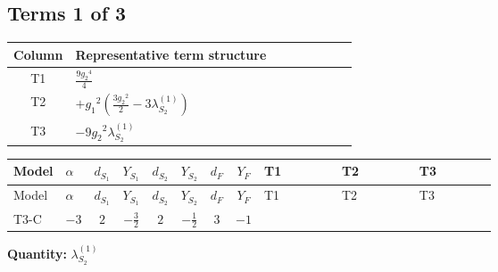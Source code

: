 \documentclass[8pt]{article}
\begin{document}
\begin{landscape}
\subsection*{Terms 1 of 3}
\begin{center}
\begin{tabular}{@{}c >{\raggedright\arraybackslash}p{0.82\linewidth}@{}}
\toprule
Column & Representative term structure \\
\midrule
T1 & \(\displaystyle \frac{9 {g_2}^4}{4}\) \\
\midrule
T2 & \(\displaystyle +{g_1}^2 \left(\frac{3 {g_2}^2}{2}-3 {\lambda_{S_2}^{(1)}}\right)\) \\
\midrule
T3 & \(\displaystyle -9 {g_2}^2 {\lambda_{S_2}^{(1)}}\) \\
\midrule
\bottomrule
\end{tabular}
\end{center}
\smallskip
\tiny
\begin{longtable}{@{}llcccccc >{\raggedright\arraybackslash}p{0.21\linewidth} >{\raggedright\arraybackslash}p{0.21\linewidth} >{\raggedright\arraybackslash}p{0.21\linewidth}@{}}
\toprule
Model & $\alpha$ & $d_{S_1}$ & $Y_{S_1}$ & $d_{S_2}$ & $Y_{S_2}$ & $d_F$ & $Y_F$ & T1 & T2 & T3 \\
\midrule
\endfirsthead
\toprule
Model & $\alpha$ & $d_{S_1}$ & $Y_{S_1}$ & $d_{S_2}$ & $Y_{S_2}$ & $d_F$ & $Y_F$ & T1 & T2 & T3 \\
\midrule
\endhead
T3-C & $-3$ & $2$ & $-\frac{3}{2}$ & $2$ & $-\frac{1}{2}$ & $3$ & $-1$ & \scriptsize\adjustbox{max width=\linewidth}{$\begin{gathered} \frac{9 {g_2}^4}{4}\end{gathered}$} & \scriptsize\adjustbox{max width=\linewidth}{$\begin{gathered} +{g_1}^2 \left(\frac{3 {g_2}^2}{2}-3 {\lambda_{S_2}^{(1)}}\right)\end{gathered}$} & \scriptsize\adjustbox{max width=\linewidth}{$\begin{gathered} -9 {g_2}^2 {\lambda_{S_2}^{(1)}}\end{gathered}$} \\
\midrule
\bottomrule
\end{longtable}
\clearpage
\noindent\textbf{Quantity: }$\lambda_{S_2}^{(1)}$\par\smallskip

\end{landscape}
\end{document}
